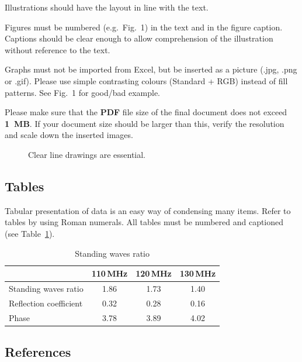 \documentclass{eupvsec}
\begin{document}
Illustrations should have the layout in line with the text.

Figures must be numbered (e.g.\ Fig.~1) in the text and in the figure
caption. Captions should be clear enough to allow comprehension of the
illustration without reference to the text.

Graphs must not be imported from Excel, but be inserted as a picture
(.jpg, .png or .gif). Please use simple contrasting colours (Standard
+ RGB) instead of fill patterns. See Fig.~1 for good/bad example.

Please make sure that the \textbf{PDF} file size of the final document
does not exceed \textbf{1~MB}. If your document size should be larger
than this, verify the resolution and scale down the inserted images.

\begin{figure}[t]
  \centering
  \caption{Clear line drawings are essential.}
  \label{fig:example}
\end{figure}

\subsection{Tables}

Tabular presentation of data is an easy way of condensing many items.
Refer to tables by using Roman numerals. All tables must be numbered
and captioned (see Table~\ref{tab:swr}).

\begin{table}[t]
  \centering
  \caption{Standing waves ratio}
  \label{tab:swr}
  \begin{tabular}{lccc}
    \hline
     & 110\,MHz & 120\,MHz & 130\,MHz \\
    \hline
    Standing waves ratio   & 1.86 & 1.73 & 1.40 \\
    Reflection coefficient & 0.32 & 0.28 & 0.16 \\
    Phase                  & 3.78 & 3.89 & 4.02 \\
    \hline
  \end{tabular}
\end{table}

\subsection{References}
\end{document}
